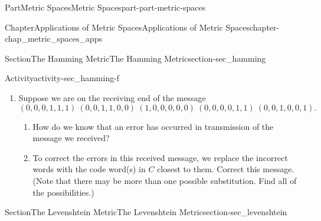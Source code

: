 \documentclass[oneside,10pt,]{book}
\numberwithin{equation}{chapter}
\newcommand{\amp}{&}
\begin{document}
\begin{partptx}{Part}{Metric Spaces}{}{Metric Spaces}{}{}{part-part-metric-spaces}
\begin{chapterptx}{Chapter}{Applications of Metric Spaces}{}{Applications of Metric Spaces}{}{}{chapter-chap_metric_spaces_apps}
\begin{sectionptx}{Section}{The Hamming Metric}{}{The Hamming Metric}{}{}{section-sec_hamming}
\begin{activity}{Activity}{}{activity-sec_hamming-f}
\begin{enumerate}[font=\bfseries,label=(\alph*),ref=\alph*]
\begin{align*}
c_4 \amp = (0,0,1,0,0,1) \amp c_5 \amp = (0,0,0,1,1,0) \amp c_6 \amp = (0,0,1,0,1,0)\\
c_7 \amp = (0,0,1,1,0,0) \amp c_8 \amp = (0,0,1,1,1,1) \amp \amp 
\end{align*}
That is, the words \(c_1\), \(c_2\), \(c_3\), \(c_4\), \(c_5\), \(c_6\), \(c_7\), \(c_8\) are the only words that can comprise a message. Find \(d_H(c_2, c_8)\).%
\item{}Suppose we are on the receiving end of the message%
\begin{equation}
(0,0,0,1,1,1) \ (0,0,1,1,0,0) \ (1,0,0,0,0,0) \ (0,0,0,0,1,1) \ (0,0,1,0,0,1)\text{.}\label{men-eq_message}
\end{equation}
%
\begin{enumerate}[font=\bfseries,label=(\roman*),ref=\theenumi.\roman*]%
\item{}How do we know that an error has occurred in transmission of the message we received?%
\item{}To correct the errors in this received message, we replace the incorrect words with the code word(s) in \(C\) closest to them. Correct this message. (Note that there may be more than one possible substitution. Find all of the possibilities.)%
\end{enumerate}%
\end{enumerate}%
\end{activity}%
\end{sectionptx}
%
%
\typeout{************************************************}
\typeout{************************************************}
%
\begin{sectionptx}{Section}{The Levenshtein Metric}{}{The Levenshtein Metric}{}{}{section-sec_levenshtein}

\end{sectionptx}
\end{chapterptx}
\end{partptx}
\end{document}

